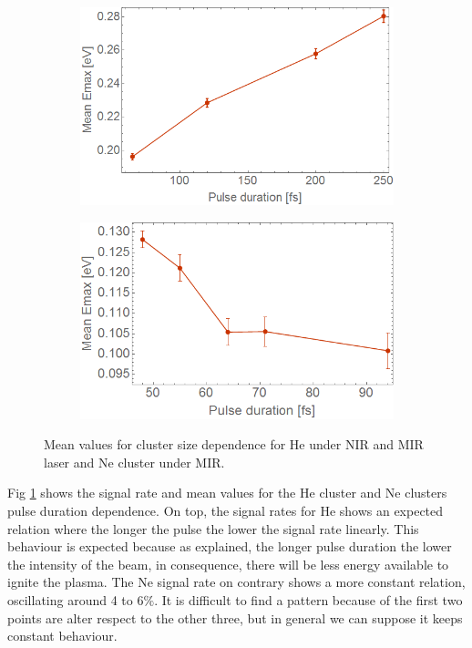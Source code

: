 \begin{figure}[h!]
\begin{subfigure}[l]{0.48\textwidth}
\includegraphics[width=1\textwidth]{../Images/results/MIR_He_pulsescan/raw/meanenergt.png} 
\end{subfigure}
\begin{subfigure}[l]{0.48\textwidth}
\includegraphics[width=1\textwidth]{../Images/results/MIR_Ne_pulseduration/MeanEnerg.png} 
\end{subfigure}

\caption[Cluster size- Mean values]{Mean values for cluster size dependence for He  under NIR and MIR laser and Ne cluster under MIR.}
\label{fig:pulsemean}
\end{figure}

Fig \ref{fig:pulsemean} shows the signal rate and mean values for the He cluster and Ne clusters pulse  duration dependence. On top, the signal rates for He shows an expected relation where the longer the pulse the lower the signal rate linearly. This behaviour is expected because as  explained, the longer pulse duration the lower the intensity of the beam, in consequence, there will be less energy available to ignite the plasma. The Ne signal rate on contrary shows a more constant relation, oscillating around 4 to 6$\%$. It is difficult to find a pattern because of the first two points are alter respect to the other three, but in general we can suppose it keeps constant behaviour.

